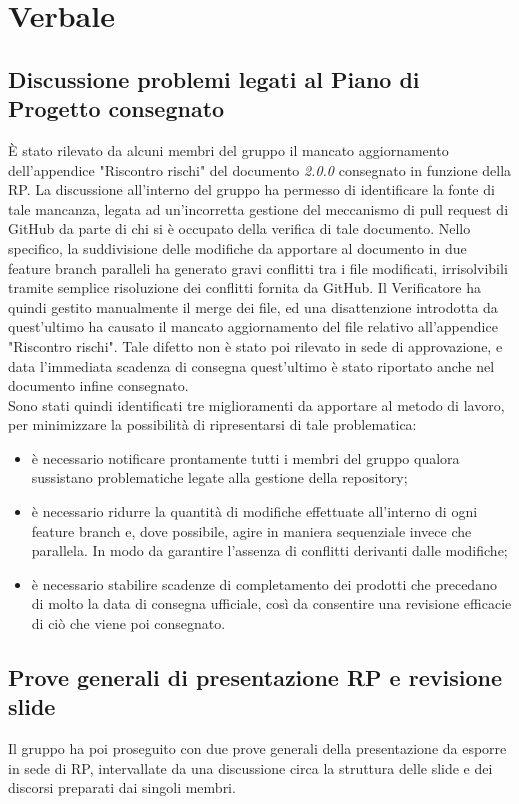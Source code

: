 \section{Verbale}

	\subsection{Discussione problemi legati al Piano di Progetto consegnato}
		È stato rilevato da alcuni membri del gruppo il mancato aggiornamento dell'appendice "Riscontro rischi" del documento \PdP{} \textit{2.0.0} consegnato in funzione della RP.
		La discussione all'interno del gruppo ha permesso di identificare la fonte di tale mancanza, legata ad un'incorretta gestione del meccanismo di pull request di GitHub da parte di chi si è occupato della verifica di tale documento.
		Nello specifico, la suddivisione delle modifiche da apportare al documento in due feature branch paralleli ha generato gravi conflitti tra i file modificati, irrisolvibili tramite semplice risoluzione dei conflitti fornita da GitHub.
		Il Verificatore ha quindi gestito manualmente il merge dei file, ed una disattenzione introdotta da quest'ultimo ha causato il mancato aggiornamento del file relativo all'appendice "Riscontro rischi". Tale difetto non è stato poi rilevato in sede di approvazione, e data l'immediata scadenza di consegna quest'ultimo è stato riportato anche nel documento infine consegnato. \\
		Sono stati quindi identificati tre miglioramenti da apportare al metodo di lavoro, per minimizzare la possibilità di ripresentarsi di tale problematica:
		\begin{itemize}
			\item è necessario notificare prontamente tutti i membri del gruppo qualora sussistano problematiche legate alla gestione della repository;
			\item è necessario ridurre la quantità di modifiche effettuate all'interno di ogni feature branch e, dove possibile, agire in maniera sequenziale invece che parallela. In modo da garantire l'assenza di conflitti derivanti dalle modifiche;
			\item è necessario stabilire scadenze di completamento dei prodotti che precedano di molto la data di consegna ufficiale, così da consentire una revisione efficacie di ciò che viene poi consegnato.
		\end{itemize}

	\subsection{Prove generali di presentazione RP e revisione slide}
		Il gruppo ha poi proseguito con due prove generali della presentazione da esporre in sede di RP, intervallate da una discussione circa la struttura delle slide e dei discorsi preparati dai singoli membri.
